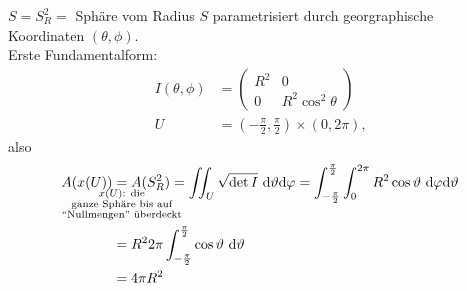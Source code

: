 \begin{example}
  $ S = S_R^2 = $ Sphäre vom Radius $ S $ parametrisiert durch georgraphische Koordinaten $ (\theta, \phi) $. \\
  Erste Fundamentalform:
  \begin{align*}
    I(\theta, \phi) &= \begin{pmatrix}
    R^2 & 0 \\
    0 & R^2\cos^2 \theta
  \end{pmatrix} \\
  U &= (-\frac{\pi}{2}, \frac{\pi}{2}) \times (0, 2\pi)\text{,}
  \end{align*}
  also
  \begin{align*}
    A(x(U)) &\underset{\mathclap{\substack{x(U) \text{: die} \\ \text{ganze Sphäre bis auf} \\ \text{``Nullmengen'' überdeckt}}}}{=} A(S_R^2) = \iint_U \sqrt{\det I} \ \text{d}\theta \text{d}\phi = \int_{-\frac{\pi}{2}}^{\frac{\pi}{2}} \int_0^{2\pi} R^2\cos \theta \ \text{d}\phi\text{d}\theta \\
     &= R^2 2\pi \int_{-\frac{\pi}{2}}^{\frac{\pi}{2}} \cos \theta \ \text{d}\theta \\
     &= 4 \pi R^2
  \end{align*}
\end{example}